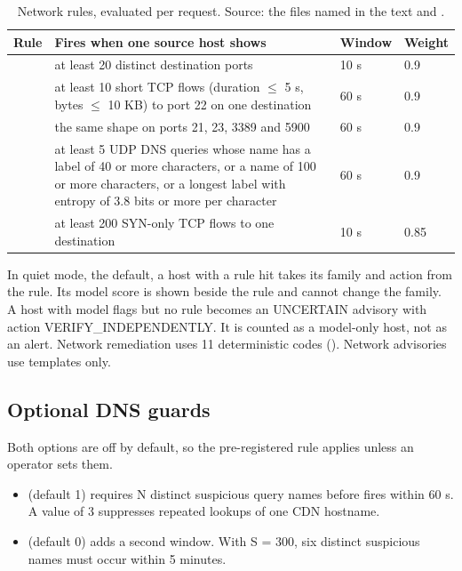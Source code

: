 \begin{table}[t]
\centering
\caption{Network rules, evaluated per request. Source: the files named in the text and .}\label{tab:netrules}
\footnotesize
\setlength{\tabcolsep}{3pt}
\begin{tabularx}{\linewidth}{>{\raggedright\arraybackslash}p{3.1cm}Yp{1.5cm}p{1.1cm}}
\toprule
Rule & Fires when one source host shows & Window & Weight \\
\midrule
{} & at least 20 distinct destination ports & 10 s & 0.9 \\
 & at least 10 short TCP flows (duration $\leq$ 5 s, bytes $\leq$ 10 KB) to port 22 on one destination & 60 s & 0.9 \\
 & the same shape on ports 21, 23, 3389 and 5900 & 60 s & 0.9 \\
 & at least 5 UDP DNS queries whose name has a label of 40 or more characters, or a name of 100 or more characters, or a longest label with entropy of 3.8 bits or more per character & 60 s & 0.9 \\
 & at least 200 SYN-only TCP flows to one destination & 10 s & 0.85 \\
\bottomrule
\end{tabularx}
\end{table}

In quiet mode, the default, a host with a rule hit takes its family and action from the rule. Its model score is shown beside the rule and cannot change the family. A host with model flags but no rule becomes an UNCERTAIN advisory with action VERIFY\_INDEPENDENTLY. It is counted as a model-only host, not as an alert. Network remediation uses 11 deterministic codes (). Network advisories use templates only.

\subsection{Optional DNS guards}

Both options are off by default, so the pre-registered rule applies unless an operator sets them.

\begin{itemize}
\item {} (default 1) requires N distinct suspicious query names before  fires within 60 s. A value of 3 suppresses repeated lookups of one CDN hostname.
\item {} (default 0) adds a second window. With S = 300, six distinct suspicious names must occur within 5 minutes.
\end{itemize}

